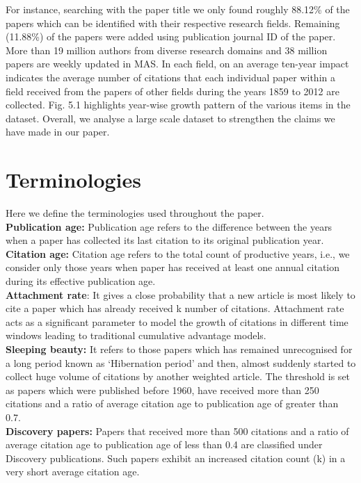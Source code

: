 For instance, searching with the paper title we only found roughly 88.12\% of the papers which can be identified with their respective research fields. Remaining (11.88\%) of the papers were added using publication journal ID of the paper. More than 19 million authors from diverse research domains and 38 million papers are weekly updated in MAS. In each field, on an average ten-year impact indicates the average number of citations that each individual paper within a field received from the papers of other fields during the years 1859 to 2012 are collected. Fig. 5.1 highlights year-wise growth pattern of the various items in the dataset. Overall, we analyse a large scale dataset to strengthen the claims we have made in our paper.
\section{Terminologies}
\label{S:2}
Here we define the terminologies used throughout the paper.\\

\textbf{Publication age:} Publication age refers to the difference between the years when a paper has collected its last citation to its original publication year.\\

\textbf{Citation age:} Citation age refers to the total count of productive years, i.e., we consider only those years when paper has received at least one annual citation during its effective publication age.\\

\textbf{Attachment rate}: It gives a close probability that a new article is most likely to cite a paper which has already received k number of citations. Attachment rate acts as a significant parameter to model the growth of citations in different time windows leading to traditional cumulative advantage models.\\

\textbf{Sleeping beauty:} It refers to those papers which has remained unrecognised for a long period known as ‘Hibernation period’ and then, almost suddenly started to collect huge volume of citations by another weighted article. The threshold is set as papers which were published before 1960, have received more than 250 citations and a ratio of average citation age to publication age of greater than 0.7.\\

\textbf{Discovery papers:} Papers that received more than 500 citations and a ratio of average citation age to publication age of less than 0.4 are classified under Discovery publications. Such papers exhibit an increased citation count (k) in a very short average citation age.\\

